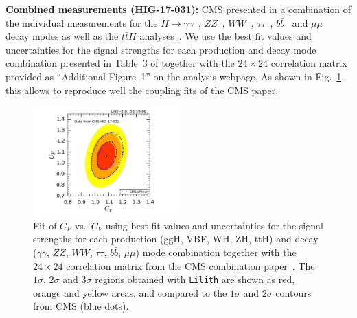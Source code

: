 {\bf\boldmath Combined measurements (HIG-17-031):} 
CMS presented in \cite{Sirunyan:2018koj} a combination of the individual measurements for the 
$H\to \gamma\gamma$~\cite{Sirunyan:2018ouh}, $ZZ$~\cite{Sirunyan:2017exp}, $WW$~\cite{Sirunyan:2018egh}, 
$\tau\tau$~\cite{Sirunyan:2017khh}, $b\bar b$~\cite{Sirunyan:2017elk,Sirunyan:2017dgc} and $\mu\mu$~\cite{Sirunyan:2018hbu} 
decay modes as well as the $t\bar tH$ analyses~\cite{Sirunyan:2018shy,Sirunyan:2018mvw,Sirunyan:2018ygk}. 
We use the best fit values and uncertainties for the signal strengths for each production %
and decay  %
mode combination presented in Table~3 of \cite{Sirunyan:2018koj} together with the $24\times 24$ correlation matrix 
provided as ``Additional Figure~1'' on the analysis webpage. As shown in Fig.~\ref{fig:validation_cms_combination}, 
this allows to reproduce well the coupling fits of the CMS paper.\\

\begin{figure}[hbt!]\centering
\includegraphics[width=0.5\textwidth]{validation/CMS/HIG-17-031-CVCF.pdf}
\caption{Fit of $C_F$ vs.\ $C_V$ using best-fit values and uncertainties for the signal strengths for each production (ggH, VBF, WH, ZH, ttH) 
and decay ($\gamma\gamma$, $ZZ$, $WW$, $\tau\tau$, $b\bar b$, $\mu\mu$) mode combination together with the 
$24\times 24$ correlation matrix from the CMS combination paper~\cite{Sirunyan:2018koj}. 
The  $1\sigma$,  $2\sigma$ and $3\sigma$ regions obtained with {\tt Lilith} are shown as red, orange and yellow areas, 
and compared to the $1\sigma$ and $2\sigma$ contours from CMS (blue dots).}
\label{fig:validation_cms_combination}
\end{figure}

